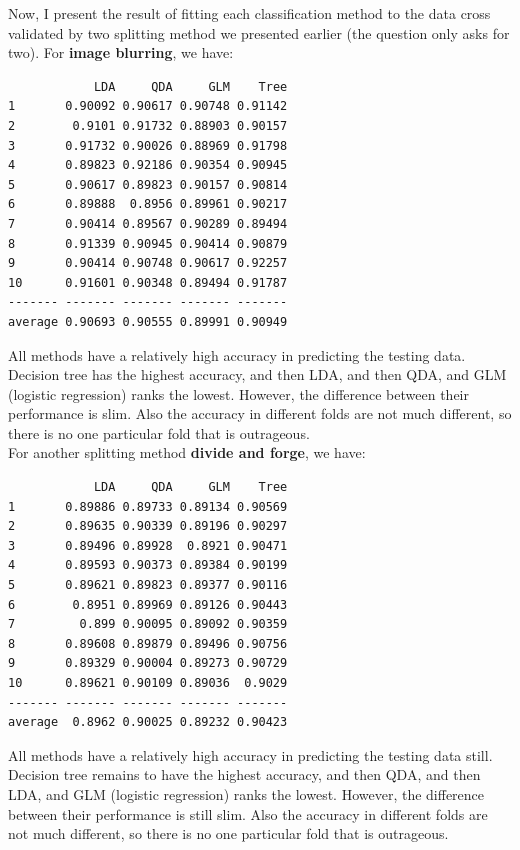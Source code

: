 \documentclass[jou]{apa}%
\begin{document}
\indent Now, I present the result of fitting each classification method to the data cross validated by two splitting method we presented earlier (the question only asks for two). For \textbf{image blurring}, we have:
\begin{verbatim}
            LDA     QDA     GLM    Tree
1       0.90092 0.90617 0.90748 0.91142
2        0.9101 0.91732 0.88903 0.90157
3       0.91732 0.90026 0.88969 0.91798
4       0.89823 0.92186 0.90354 0.90945
5       0.90617 0.89823 0.90157 0.90814
6       0.89888  0.8956 0.89961 0.90217
7       0.90414 0.89567 0.90289 0.89494
8       0.91339 0.90945 0.90414 0.90879
9       0.90414 0.90748 0.90617 0.92257
10      0.91601 0.90348 0.89494 0.91787
------- ------- ------- ------- -------
average 0.90693 0.90555 0.89991 0.90949
\end{verbatim}
All methods have a relatively high accuracy in predicting the testing data. Decision tree has the highest accuracy, and then LDA, and then QDA, and GLM (logistic regression) ranks the lowest. However, the difference between their performance is slim. Also the accuracy in different folds are not much different, so there is no one particular fold that is outrageous. \\
For another splitting method \textbf{divide and forge}, we have:
\begin{verbatim}
            LDA     QDA     GLM    Tree
1       0.89886 0.89733 0.89134 0.90569
2       0.89635 0.90339 0.89196 0.90297
3       0.89496 0.89928  0.8921 0.90471
4       0.89593 0.90373 0.89384 0.90199
5       0.89621 0.89823 0.89377 0.90116
6        0.8951 0.89969 0.89126 0.90443
7         0.899 0.90095 0.89092 0.90359
8       0.89608 0.89879 0.89496 0.90756
9       0.89329 0.90004 0.89273 0.90729
10      0.89621 0.90109 0.89036  0.9029
------- ------- ------- ------- -------
average  0.8962 0.90025 0.89232 0.90423
\end{verbatim}
All methods have a relatively high accuracy in predicting the testing data still. Decision tree remains to have the highest accuracy, and then QDA, and then LDA, and GLM (logistic regression) ranks the lowest. However, the difference between their performance is still slim. Also the accuracy in different folds are not much different, so there is no one particular fold that is outrageous.\\
\end{document}
